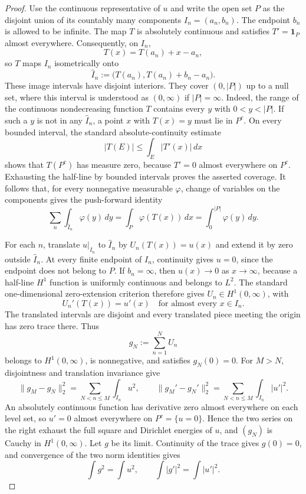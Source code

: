 \documentclass[11pt]{amsart}
\theoremstyle{definition}
\theoremstyle{remark}
\begin{document}
\begin{proof}
Use the continuous representative of $u$ and write the open set $P$ as the
disjoint union of its countably many components $I_n=(a_n,b_n)$. The endpoint
$b_n$ is allowed to be infinite. The map $T$ is absolutely continuous and
satisfies $T'=\mathbf1_P$ almost everywhere. Consequently, on $I_n$,
\[
 T(x)=T(a_n)+x-a_n,
\]
so $T$ maps $I_n$ isometrically onto
\[
 \widehat I_n:=\bigl(T(a_n),T(a_n)+b_n-a_n\bigr).
\]
These image intervals have disjoint interiors. They cover $(0,|P|)$ up to a
null set, where this interval is understood as $(0,\infty)$ if $|P|=\infty$.
Indeed, the range of the continuous nondecreasing function $T$ contains every
$y$ with $0<y<|P|$. If such a $y$ is not in any $\widehat I_n$, a point
$x$ with $T(x)=y$ must lie in $P^c$. On every bounded interval, the standard
absolute-continuity estimate
\[
 |T(E)|\leq\int_E|T'(x)|\,dx
\]
shows that $T(P^c)$ has measure zero, because $T'=0$ almost everywhere on
$P^c$. Exhausting the half-line by bounded intervals proves the asserted
coverage. It follows that, for every nonnegative measurable $\varphi$,
change of variables on the components gives the push-forward identity
\[
 \sum_n\int_{\widehat I_n}\varphi(y)\,dy
 =\int_P\varphi(T(x))\,dx
 =\int_0^{|P|}\varphi(y)\,dy.
\]

For each $n$, translate $u|_{I_n}$ to $\widehat I_n$ by
$U_n(T(x))=u(x)$ and extend it by zero outside $\widehat I_n$. At every finite
endpoint of $I_n$, continuity gives $u=0$, since the endpoint does not belong
to $P$. If $b_n=\infty$, then $u(x)\to0$ as $x\to\infty$, because a half-line
$H^1$ function is uniformly continuous and belongs to $L^2$. The standard
one-dimensional zero-extension criterion therefore gives
$U_n\in H^1(0,\infty)$, with
\[
 U_n'(T(x))=u'(x)\quad\text{for almost every }x\in I_n.
\]
The translated intervals are disjoint and every translated piece meeting the
origin has zero trace there. Thus
\[
 g_N:=\sum_{n=1}^N U_n
\]
belongs to $H^1(0,\infty)$, is nonnegative, and satisfies $g_N(0)=0$. For
$M>N$, disjointness and translation invariance give
\[
 \|g_M-g_N\|_2^2=\sum_{N<n\leq M}\int_{I_n}u^2,
 \qquad
 \|g_M'-g_N'\|_2^2=\sum_{N<n\leq M}\int_{I_n}|u'|^2.
\]
An absolutely continuous function has derivative zero almost everywhere on
each level set, so $u'=0$ almost everywhere on $P^c=\{u=0\}$. Hence the two
series on the right exhaust the full square and Dirichlet energies of $u$, and
$(g_N)$ is Cauchy in $H^1(0,\infty)$. Let $g$ be its limit. Continuity of the
trace gives $g(0)=0$, and convergence of the two norm identities gives
\[
 \int g^2=\int u^2,
 \qquad
 \int|g'|^2=\int|u'|^2.
\]


\end{proof}
\end{document}
